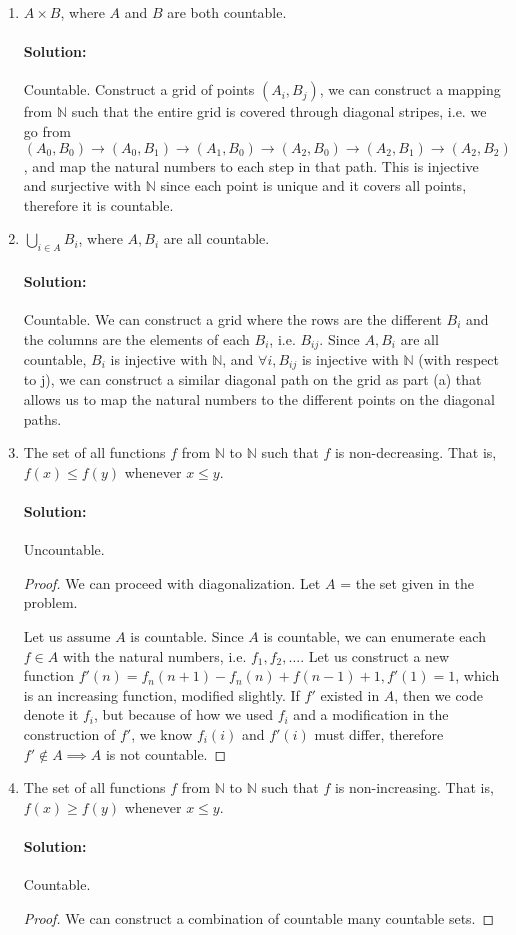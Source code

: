 \documentclass[11pt, notitlepage]{report}
\newcommand{\N}{\mathbb{N}}
\newenvironment{solution}{\paragraph{Solution:}}{\hfill}
\begin{document}
\begin{enumerate}[label=\alph*.)]
    \item $A \times B$, where $A$ and $B$ are both countable.
    \begin{solution} Countable. Construct a grid of points $(A_i, B_j)$, we can construct a mapping from $\N$ such that the entire grid is covered through diagonal stripes, i.e. we go from $(A_0, B_0)\rightarrow (A_0, B_1)\rightarrow (A_1, B_0) \rightarrow (A_2, B_0) \rightarrow (A_2, B_1) \rightarrow (A_2, B_2)$, and map the natural numbers to each step in that path. This is injective and surjective with $\N$ since each point is unique and it covers all points, therefore it is countable.
    \end{solution}
    \item $\bigcup_{i\in A} B_i$, where $A, B_i$ are all countable.
   	\begin{solution}
   		Countable. We can construct a grid where the rows are the different $B_i$ and the columns are the elements of each $B_i$, i.e. $B_{ij}$. Since $A, B_i$ are all countable, $B_i$ is injective with $\N$, and $\forall i, B_{ij}$ is injective with $\N$ (with respect to j), we can construct a similar diagonal path on the grid as part (a) that allows us to map the natural numbers to the different points on the diagonal paths.
   	\end{solution}
    \item The set of all functions $f$ from $\N$ to $\N$ such that $f$ is
    non-decreasing. That is, $f(x) \leq f(y)$ whenever $x \leq y$.
    \begin{solution}
    	Uncountable. 
    	\begin{proof}
    		We can proceed with diagonalization. Let $A$ = the set given in the problem. 
    		
    		Let us assume $A$ is countable. Since $A$ is countable, we can enumerate each $f\in A$ with the natural numbers, i.e. $f_1, f_2, \dots$. Let us construct a new function $f'(n)= {f_n(n+1)-f_n(n) + f(n-1) + 1}, f'(1)=1$, which is an increasing function, modified slightly. If $f'$ existed in $A$, then we code denote it $f_i$, but because of how we used $f_i$ and a modification in the construction of $f'$, we know $f_i(i)$ and $f'(i)$ must differ, therefore $f'\not\in A \implies A$ is not countable.
    	\end{proof}
    \end{solution}
    \item The set of all functions $f$ from $\N$ to $\N$ such that $f$ is
    non-increasing. That is, $f(x) \geq f(y)$ whenever $x \leq y$.
	\begin{solution}
		Countable.
		\begin{proof}
			We can construct a combination of countable many countable sets.
		\end{proof}
	\end{solution}    
	

\end{enumerate}
\end{document}
